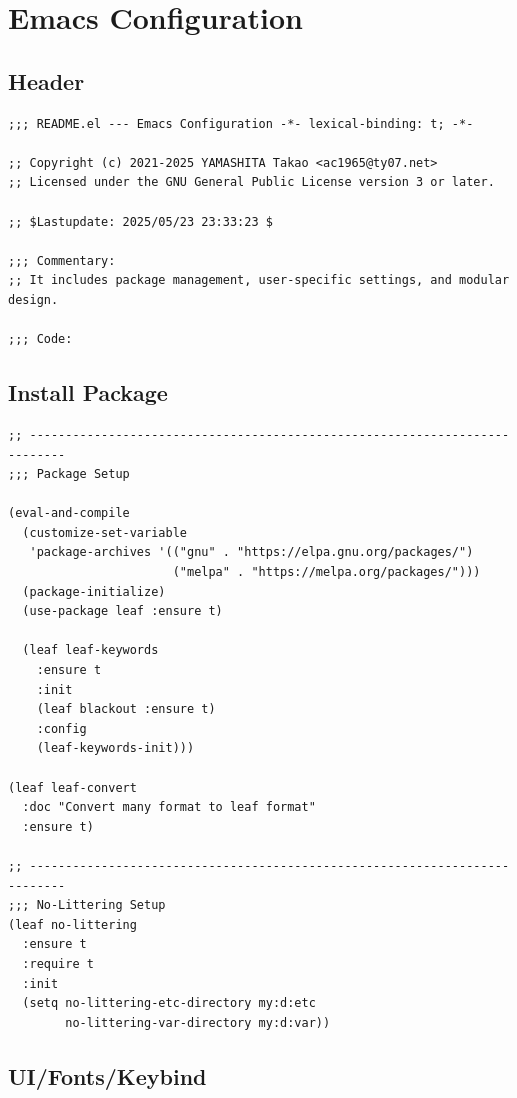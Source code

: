 \documentclass[11pt]{article}
\begin{document}
\section{Emacs Configuration}
\label{sec:org47703e8}

\subsection{Header}
\label{sec:org4ddfaee}

\begin{verbatim}
;;; README.el --- Emacs Configuration -*- lexical-binding: t; -*-

;; Copyright (c) 2021-2025 YAMASHITA Takao <ac1965@ty07.net>
;; Licensed under the GNU General Public License version 3 or later.

;; $Lastupdate: 2025/05/23 23:33:23 $

;;; Commentary:
;; It includes package management, user-specific settings, and modular design.

;;; Code:
\end{verbatim}
\subsection{Install Package}
\label{sec:orgd44621f}

\begin{verbatim}
;; ---------------------------------------------------------------------------
;;; Package Setup

(eval-and-compile
  (customize-set-variable
   'package-archives '(("gnu" . "https://elpa.gnu.org/packages/")
                       ("melpa" . "https://melpa.org/packages/")))
  (package-initialize)
  (use-package leaf :ensure t)

  (leaf leaf-keywords
    :ensure t
    :init
    (leaf blackout :ensure t)
    :config
    (leaf-keywords-init)))

(leaf leaf-convert
  :doc "Convert many format to leaf format"
  :ensure t)

;; ---------------------------------------------------------------------------
;;; No-Littering Setup
(leaf no-littering
  :ensure t
  :require t
  :init
  (setq no-littering-etc-directory my:d:etc
        no-littering-var-directory my:d:var))
\end{verbatim}
\subsection{UI/Fonts/Keybind}
\label{sec:orge89d61b}
\end{document}
